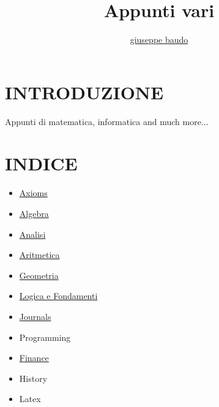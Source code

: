 \documentclass[a4paper,10pt]{article}
\title{Appunti vari}
\author{\href{http://www.baudo.hol.es}{giuseppe baudo}}
\begin{document}
\maketitle

\section{INTRODUZIONE}
Appunti di matematica, informatica and much more...

\section{INDICE}
\begin{itemize}
  \item \href{./axioms/Axioms.html}{Axioms}
  \item \href{./algebra/AlgebraIndex.html}{Algebra}
  \item \href{./analisi/Analisi.html}{Analisi} 
  \item \href{./aritmetica/Aritmetica.html}{Aritmetica}
  \item \href{./geometria/Geometria.html}{Geometria} 
  \item \href{./logica/Logics.html}{Logica e Fondamenti}
  \item \href{./misc/Journals.html}{Journals}
  \item Programming
  \item \href{./finance/finance.html}{Finance} 
  \item History 
  \item Latex 
  
\end{itemize}
\end{document}
